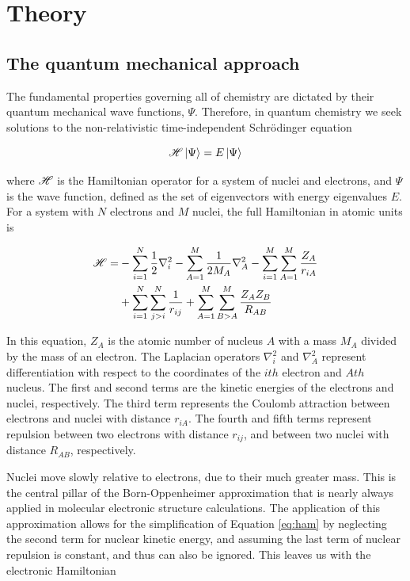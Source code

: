 
\chapter{Theory}
\label{ch:theory}

\section{The quantum mechanical approach}

The fundamental properties governing all of chemistry are dictated by their
quantum mechanical wave functions, $\Psi$. Therefore, in quantum chemistry we
seek solutions to the non-relativistic time-independent Schr{\"o}dinger equation

\begin{equation}
\mathscr{H} \ket{\Psi} = E \ket{\Psi}
\label{eq:schrodinger}
\end{equation}

\noindent where $\mathscr{H}$ is the Hamiltonian operator for a system of nuclei and
electrons, and $\Psi$ is the wave function, defined as the set of eigenvectors
with energy eigenvalues $E$.\cite{Griffiths2016} For a system with $N$ electrons
and $M$ nuclei, the full Hamiltonian in atomic units is

\begin{equation}
\begin{split}
\mathscr{H} = &-\sum_{i=1}^N \frac{1}{2}\nabla_i^2 - \sum_{A=1}^M\frac{1}{2M_A}\nabla_A^2
-\sum_{i=1}^M\sum_{A=1}^M\frac{Z_A}{r_{iA}} \\
&+ \sum_{i=1}^N\sum_{j>i}^N \frac{1}{r_{ij}} + \sum_{A=1}^M\sum_{B>A}^M
\frac{Z_AZ_B}{R_{AB}}
\label{eq:ham}
\end{split}
\end{equation}

\noindent In this equation, $Z_A$ is the atomic number of nucleus $A$ with a
mass $M_A$ divided by the mass of an electron. The Laplacian operators
$\nabla_i^2$ and $\nabla_A^2$ represent differentiation with respect to the
coordinates of the $ith$ electron and $Ath$ nucleus. The first and second terms
are the kinetic energies of the electrons and nuclei, respectively. The third
term represents the Coulomb attraction between electrons and nuclei with
distance $r_{iA}$. The fourth and fifth terms represent repulsion between two
electrons with distance $r_{ij}$, and between two nuclei with distance $R_{AB}$,
respectively.

Nuclei move slowly relative to electrons, due to their much greater mass. This
is the central pillar of the Born-Oppenheimer approximation that is nearly
always applied in molecular electronic structure calculations. The application
of this approximation allows for the simplification of Equation \ref{eq:ham} by
neglecting the second term for nuclear kinetic energy, and assuming the last
term of nuclear repulsion is constant, and thus can also be ignored. This leaves
us with the electronic Hamiltonian

